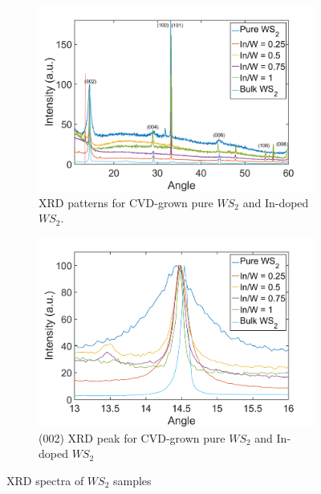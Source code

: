 \begin{figure}[!h]
	\begin{center}
		\begin{subfigure}[b]{0.7\textwidth}
			\includegraphics[width=\textwidth]{In/XRDAll.png}
			\caption{XRD patterns for CVD-grown pure $WS_2$ and In-doped $WS_2$.}
			\label{fig:InXRDAll}
		\end{subfigure}
		\qquad
		\begin{subfigure}[b]{0.7\textwidth}
			\includegraphics[width=\textwidth]{In/XRDIn.png}
			\caption{(002) XRD peak for CVD-grown pure $WS_2$ and In-doped $WS_2$}
			\label{fig:InXRDIn}
		\end{subfigure}
		\caption{XRD spectra of $WS_2$ samples}
		\label{fig:InXRDSpectra}
	\end{center}
\end{figure}

